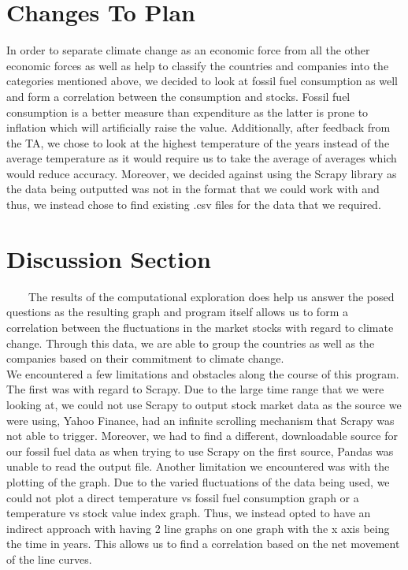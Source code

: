 \documentclass[fontsize=11pt]{article}
\begin{document}
\section*{Changes To Plan}
In order to separate climate change as an economic force from all the
other economic forces as well as help to classify the countries and
companies into the categories mentioned above, we decided to look at
fossil fuel consumption as well and form a correlation between the
consumption and stocks. Fossil fuel consumption is a better measure than
expenditure as the latter is prone to inflation which will artificially
raise the value. Additionally, after feedback from the TA, we chose to
look at the highest temperature of the years instead of the average
temperature as it would require us to take the average of averages which
would reduce accuracy. Moreover, we decided against using the Scrapy
library as the data being outputted was not in the format that we could
work with and thus, we instead chose to find existing .csv files for the
data that we required.\\

\section*{Discussion Section}

\ \ \ \ The results of the computational exploration does help us answer
the posed questions as the resulting graph and program itself allows us
to form a correlation between the fluctuations in the market stocks with
regard to climate change. Through this data, we are able to group the
countries as well as the companies based on their commitment to climate
change. \\

We encountered a few limitations and obstacles along the course of this
program. The first was with regard to Scrapy. Due to the large time
range that we were looking at, we could not use Scrapy to output stock
market data as the source we were using, Yahoo Finance, had an infinite
scrolling mechanism that Scrapy was not able to trigger. Moreover, we
had to find a different, downloadable source for our fossil fuel data as
when trying to use Scrapy on the first source, Pandas was unable to read
the output file. Another limitation we encountered was with the plotting
of the graph. Due to the varied fluctuations of the data being used, we
could not plot a direct temperature vs fossil fuel consumption graph or
a temperature vs stock value index graph. Thus, we instead opted to have
an indirect approach with having 2 line graphs on one graph with the x
axis being the time in years. This allows us to find a correlation based
on the net movement of the line curves. \\
\end{document}
